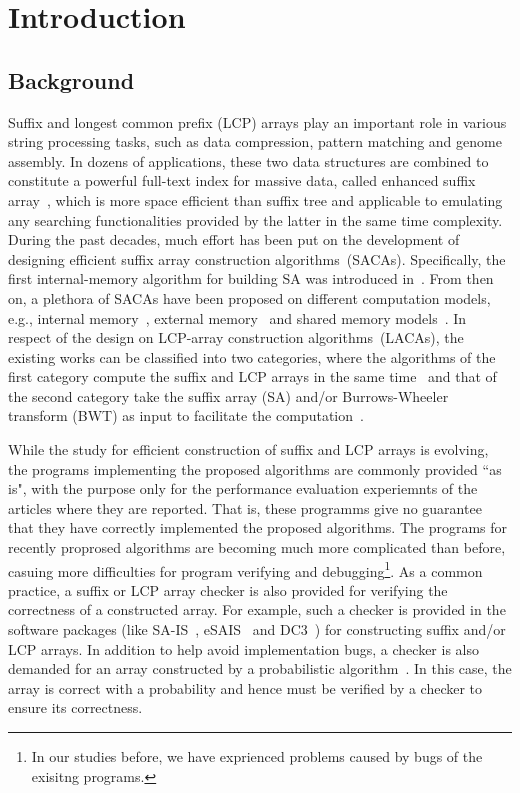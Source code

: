 \documentclass[10pt,journal,compsoc]{IEEEtran}
\begin{document}
\section{Introduction}\label{sec:introduction}

\subsection{Background} \label{sec:introduction:background}


Suffix and longest common prefix (LCP) arrays play an important role in various string processing tasks, such as data compression, pattern matching and genome assembly. In dozens of applications, these two data structures are combined to constitute a powerful full-text index for massive data, called enhanced suffix array~\cite{Abouelhodaa2004}, which is more space efficient than suffix tree and applicable to emulating any searching functionalities provided by the latter in the same time complexity. During the past decades, much effort has been put on the development of designing efficient suffix array construction algorithms~(SACAs). Specifically, the first internal-memory algorithm for building SA was introduced in~\cite{Manber1993}. From then on, a plethora of SACAs have been proposed on different computation models, e.g., internal memory~\cite{Karkkainen2003, Ko2003, Kim2003, Nong11}, external memory~\cite{Dementiev2008, Ferragina2012, Manzini2004, Bingmann12, Karkkainen2014, Nong14, Nong15} and shared memory models~\cite{Osipov2012, Deo2013, Wang2015, Karkkainen2015}. In respect of the design on LCP-array construction algorithms~(LACAs), the existing works can be classified into two categories, where the algorithms of the first category compute the suffix and LCP arrays in the same time~\cite{Fischer11, Bingmann12, Flick2015} and that of the second category take the suffix array (SA) and/or Burrows-Wheeler transform (BWT) as input to facilitate the computation~\cite{Kasai2001,Karkkainen2009, Fischer11, Puglisi2008, Puglisi2008, Deo2013, Karkkainen2016}.


While the study for efficient construction of suffix and LCP arrays is evolving, the programs implementing the proposed algorithms are commonly provided ``as is", with the purpose only for the performance evaluation experiemnts of the articles where they are reported. That is, these programms give no guarantee that they have correctly implemented the proposed algorithms. The programs for recently proprosed algorithms are becoming much more complicated than before, casuing more difficulties for program verifying and debugging\footnote{In our studies before, we have exprienced problems caused by bugs of the exisitng programs.}. As a common practice, a suffix or LCP array checker is also provided for verifying the correctness of a constructed array. For example, such a checker is provided in the software packages (like SA-IS~\cite{Nong11}, eSAIS~\cite{Bingmann12} and DC3~\cite{Dementiev08}) for constructing suffix and/or LCP arrays. In addition to help avoid implementation bugs, a checker is also demanded for an array constructed by a probabilistic algorithm~\cite{Bille2013}. In this case, the array is correct with a probability and hence must be verified by a checker to ensure its correctness.
\end{document}
